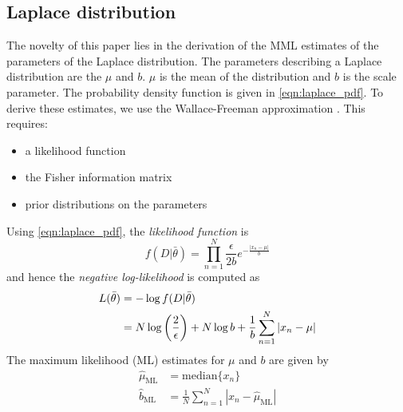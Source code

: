 \documentclass[wcp]{jmlr}
\begin{document}
\subsection{Laplace distribution}
The novelty of this paper lies in the derivation of the MML estimates of 
the parameters of the Laplace distribution.
The parameters describing a Laplace distribution are the $\mu$ and $b$. $\mu$ 
is the mean of the distribution and $b$ is the scale parameter. The probability
density function is given in \eqref{eqn:laplace_pdf}. To derive these estimates,
we use the Wallace-Freeman approximation \citep{wallace-87}. This requires:
\begin{itemize}
  \item a likelihood function
  \item the Fisher information matrix
  \item prior distributions on the parameters
\end{itemize}
Using \eqref{eqn:laplace_pdf}, the \emph{likelihood function} is
\[ f(D|\bar{\theta}) = \prod_{n=1}^N \frac{\epsilon}{2b} e^{-\frac{|x_n-\mu|}{b}} \]
and hence the \emph{negative log-likelihood} is computed as
\begin{align}
 L(\bar{\theta}) &= -\log f(D|\bar{\theta}) \notag\\
		 &= N\log\left(\frac{2}{\epsilon}\right) + N\log b + \frac{1}{b}\sum_{n=1}^N |x_n-\mu| \label{eqn:laplace_l}
\end{align}
The maximum likelihood (ML) estimates for $\mu$ and $b$ are given by
\begin{align*}
\hat{\mu}_{\mathrm{ML}} &= \mathrm{median}\{x_n\} \\ 
\hat{b}_{\mathrm{ML}} &= \frac{1}{N} \sum_{n=1}^N |x_n-\hat{\mu}_{\mathrm{ML}}|
\end{align*}
\end{document}
